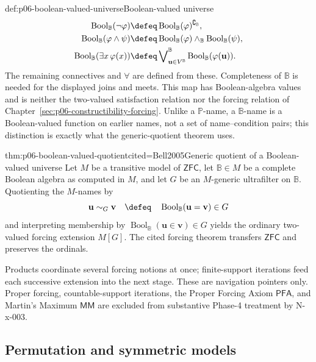 \begin{hbdefinition}{def:p06-boolean-valued-universe}{Boolean-valued universe}
\[\begin{aligned}
 \operatorname{Bool}_{\mathbb B}(\neg\varphi)
   &\defeq
     \operatorname{Bool}_{\mathbb B}(\varphi)^{\complement_{\mathbb B}},\\
 \operatorname{Bool}_{\mathbb B}(\varphi\wedge\psi)
   &\defeq\operatorname{Bool}_{\mathbb B}(\varphi)\wedge_{\mathbb B}
       \operatorname{Bool}_{\mathbb B}(\psi),\\
 \operatorname{Bool}_{\mathbb B}(\exists x\,\varphi(x))
   &\defeq\mathop{\bigvee}\nolimits^{\mathbb B}_{\mathbf u\in V^{\mathbb B}}
       \operatorname{Bool}_{\mathbb B}(\varphi(\mathbf u)).
\end{aligned}
\]
The remaining connectives and \(\forall\) are defined from these.  Completeness
of \(\mathbb B\) is needed for the displayed joins and meets.  This map has
Boolean-algebra values and is neither the two-valued satisfaction relation nor
the forcing relation of Chapter~\ref{sec:p06-constructibility-forcing}.  Unlike
a \(\mathbb P\)-name, a \(\mathbb B\)-name is a Boolean-valued function on
earlier names, not a set of name--condition pairs; this distinction is exactly
what the generic-quotient theorem uses.
\end{hbdefinition}

\begin{hbtheorem}{thm:p06-boolean-valued-quotient}{cited=Bell2005}{Generic quotient of a Boolean-valued universe}
Let \(M\) be a transitive model of \(\mathsf{ZFC}\), let
\(\mathbb B\in M\) be a complete Boolean algebra as computed in \(M\), and let
\(G\) be an \(M\)-generic ultrafilter on \(\mathbb B\).  Quotienting the
\(M\)-names by
\[
  \mathbf u\sim_G\mathbf v
  \quad\defeq\quad
  \operatorname{Bool}_{\mathbb B}(\mathbf u=\mathbf v)\in G
\]
and interpreting membership by
\(\operatorname{Bool}_{\mathbb B}(\mathbf u\in\mathbf v)\in G\) yields the ordinary
two-valued forcing extension \(M[G]\).  The cited forcing theorem transfers
\(\mathsf{ZFC}\) and preserves the ordinals.
\end{hbtheorem}

Products coordinate several forcing notions at once; finite-support iterations
feed each successive extension into the next stage.  These are navigation
pointers only.  Proper forcing, countable-support iterations, the Proper
Forcing Axiom \(\mathsf{PFA}\), and Martin's Maximum \(\mathsf{MM}\) are
excluded from substantive Phase-4 treatment by N-x-003.

\subsection{Permutation and symmetric models}

